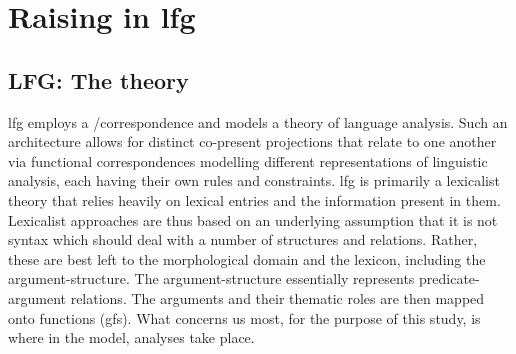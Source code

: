 \documentclass[output=paper]{LSP/langsci}
\begin{document}
\section{Raising in {\sc lfg}}

\subsection{LFG: The theory}

{\sc lfg} employs a /correspondence  and models a theory of language analysis. Such an architecture allows for distinct co-present projections that relate to one another via functional correspondences modelling different representations of linguistic analysis, each having their own rules and constraints. {\sc lfg} is primarily a lexicalist theory that relies heavily on lexical entries and the information present in them. Lexicalist approaches are thus based on an underlying assumption that it is not syntax which should deal with a number of structures and relations. Rather, these are best left to the morphological domain and the lexicon, including the argument-structure. The argument-structure essentially represents predicate-argument relations. The arguments and their thematic roles are then mapped onto  functions ({\sc gf}s). What concerns us most, for the purpose of this study, is where in the model,  analyses take place.
\end{document}
